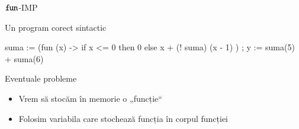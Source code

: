 \documentclass[xcolor=pdftex,romanian,colorlinks]{beamer}
\begin{document}
\begin{section}{$\mathrel{\text{\ttfamily fun}}$-IMP}
\begin{frame}[fragile]{Un program corect sintactic}
\begin{asciiml}
suma := (fun (x) -> 
               if x <= 0 
               then 0 
               else x + (! suma) (x - 1)
         ) ;
y := suma(5) + suma(6)
\end{asciiml}

\begin{block}{Eventuale probleme}
\begin{itemize}
\item Vrem să stocăm în memorie o „funcție“
\item Folosim variabila care stochează funcția în corpul funcției
\end{itemize}
\end{block}
\end{frame}
\end{section}
\end{document}
